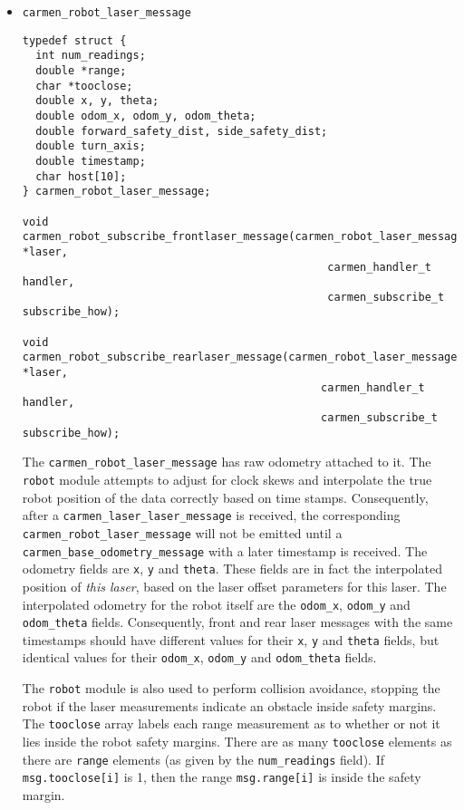 \documentclass{article}
\begin{document}
\begin{itemize}

\item \verb!carmen_robot_laser_message!

\begin{verbatim}
typedef struct {
  int num_readings;
  double *range;
  char *tooclose;
  double x, y, theta;
  double odom_x, odom_y, odom_theta;
  double forward_safety_dist, side_safety_dist;
  double turn_axis;
  double timestamp;
  char host[10];
} carmen_robot_laser_message;

void carmen_robot_subscribe_frontlaser_message(carmen_robot_laser_message *laser,
                                               carmen_handler_t handler,
                                               carmen_subscribe_t subscribe_how);

void carmen_robot_subscribe_rearlaser_message(carmen_robot_laser_message *laser,               
                                              carmen_handler_t handler,
                                              carmen_subscribe_t subscribe_how);

\end{verbatim}

The \verb!carmen_robot_laser_message! has raw odometry attached to it. The
\verb!robot! module attempts to adjust for clock skews and interpolate the
true robot position of the data correctly based on time stamps. Consequently,
after a \verb!carmen_laser_laser_message! is received, the corresponding
\verb!carmen_robot_laser_message! will not be emitted until a
\verb!carmen_base_odometry_message! with a later timestamp is received. The
odometry fields are \verb!x!, \verb!y! and \verb!theta!. These fields are in
fact the interpolated position of \emph{this laser}, based on the laser offset
parameters for this laser. The interpolated odometry for the robot itself are
the \verb!odom_x!, \verb!odom_y! and \verb!odom_theta!  fields. Consequently,
front and rear laser messages with the same timestamps should have different
values for their \verb!x!, \verb!y! and \verb!theta!  fields, but identical
values for their \verb!odom_x!, \verb!odom_y! and \verb!odom_theta! fields.

The \verb!robot! module is also used to perform collision avoidance, stopping
the robot if the laser measurements indicate an obstacle inside safety
margins. The \verb!tooclose! array labels each range measurement as to whether
or not it lies inside the robot safety margins. There are as many
\verb!tooclose! elements as there are \verb!range! elements (as given by the
\verb!num_readings! field). If \verb!msg.tooclose[i]! is 1, then the range
\verb!msg.range[i]! is inside the safety margin. 


\end{itemize}
\end{document}
